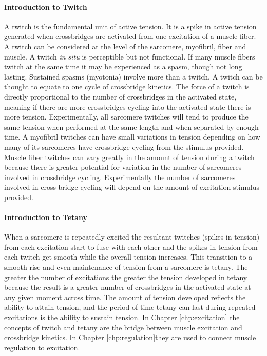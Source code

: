 \paragraph{Introduction to Twitch}
A twitch is the fundamental unit of active tension. It is a spike in active tension generated when crossbridges are activated from one excitation of a muscle fiber. A twitch can be considered at the level of the sarcomere, myofibril, fiber and muscle. A twitch \textit{in situ} is perceptible but not functional. If many muscle fibers twitch at the same time it may be experienced as a spasm, though not long lasting. Sustained spasms (myotonia) involve more than a twitch. A twitch can be thought to equate to one cycle of crossbridge kinetics. The force of a twitch is directly proportional to the number of crossbridges in the activated state, meaning if there are more crossbridges cycling into the activated state there is more tension. Experimentally, all sarcomere twitches will tend to produce the same tension when performed at the same length and when separated by enough time. A myofibril twitches can have small variations in tension depending on how many of its sarcomeres have crossbridge cycling from the stimulus provided. Muscle fiber twitches can vary greatly in the amount of tension during a twitch because there is greater potential for variation in the number of sarcomeres involved in crossbridge cycling. Experimentally the number of sarcomeres involved in cross bridge cycling will depend on the amount of excitation stimulus provided. 

\paragraph{Introduction to Tetany}
When a sarcomere is repeatedly excited the resultant twitches (spikes in tension) from each excitation start to fuse with each other and the spikes in tension from each twitch get smooth while the overall tension increases. This transition to a smooth rise and even maintenance of tension from a sarcomere is tetany. The greater the number of excitations the greater the tension developed in tetany because the result is a greater number of crossbridges in the activated state at any given moment across time. The amount of tension developed reflects the ability to attain tension, and the period of time tetany can last during repeated excitations is the ability to sustain tension.
In Chapter \ref{chp:excitation} the concepts of twitch and tetany are the bridge between muscle excitation and crossbridge kinetics. In Chapter \ref{chp:regulation}they are used to connect muscle regulation to excitation. 

